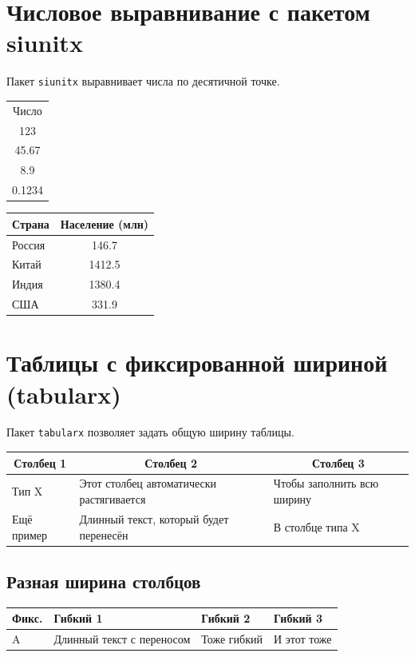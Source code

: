\documentclass[a4paper,12pt]{article}
\begin{document}
\section{Числовое выравнивание с пакетом siunitx}

Пакет \texttt{siunitx} выравнивает числа по десятичной точке.

\begin{tabular}{S}
  {Число} \\
  123 \\
  45.67 \\
  8.9 \\
  0.1234 \\
\end{tabular}

\begin{tabular}{lS}
  \toprule
  Страна & {Население (млн)} \\
  \midrule
  Россия & 146.7 \\
  Китай & 1412.5 \\
  Индия & 1380.4 \\
  США & 331.9 \\
  \bottomrule
\end{tabular}

\section{Таблицы с фиксированной шириной (tabularx)}

Пакет \texttt{tabularx} позволяет задать общую ширину таблицы.

\begin{tabularx}{\textwidth}{|l|X|X|}
  \hline
  \multicolumn{1}{|c|}{Столбец 1} & \multicolumn{1}{c|}{Столбец 2} & \multicolumn{1}{c|}{Столбец 3} \\
  \hline
  Тип X & Этот столбец автоматически растягивается & Чтобы заполнить всю ширину \\
  \hline
  Ещё пример & Длинный текст, который будет перенесён & В столбце типа X \\
  \hline
\end{tabularx}

\subsection{Разная ширина столбцов}

\begin{tabularx}{\textwidth}{|l|X|X|X|}
  \hline
  Фикс. & Гибкий 1 & Гибкий 2 & Гибкий 3 \\
  \hline
  A & Длинный текст с переносом & Тоже гибкий & И этот тоже \\
  \hline
\end{tabularx}
\end{document}
